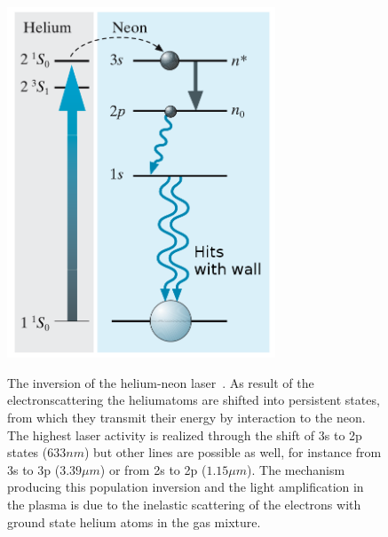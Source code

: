 \begin{figure}
    \begin{centering}
        \caption{The inversion of the helium-neon laser~\cite{christian2003gerthsen}. 
            As result of the electronscattering the
    heliumatoms are shifted into persistent states, from which they transmit their energy by
    interaction to the neon. The highest laser activity is realized
    through the shift of 3s to 2p states ($633nm$) but other lines are possible as well,
    for instance from 3s to 3p ($3.39 \mu m$) or from 2s to 2p ($1.15\mu m$). The mechanism
    producing this population inversion and the light amplification in the plasma is due
    to the inelastic scattering of the electrons with ground state helium atoms in the gas
    mixture.}
        \includegraphics[width=8cm]{figures/helium-neon-laser}
        \label{fig:integral}
    \end{centering}
\end{figure}

